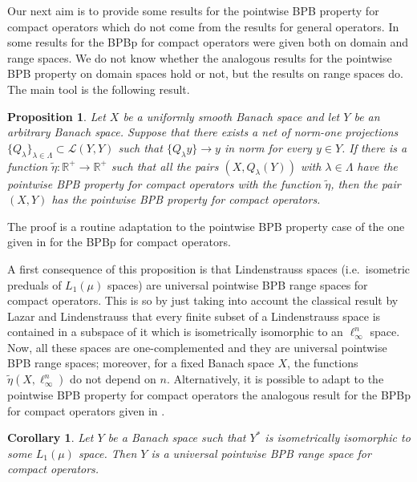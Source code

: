 \documentclass[a4paper,10pt]{amsart}
\theoremstyle{plain}
\newtheorem{corollary}[theorem]{Corollary}
\newtheorem{proposition}[theorem]{Proposition}
\theoremstyle{definition}
\newcommand{\R}{\mathbb{R}}
\begin{document}
Our next aim is to provide some results for the pointwise BPB property for compact operators which do not come from the results for general operators. In \cite{DGMM} some results for the BPBp for compact operators were given both on domain and range spaces. We do not know whether the analogous results for the pointwise BPB property on domain spaces hold or not, but the results on range spaces do. The main tool is the following result.


\begin{proposition}\label{pointwise BPB property:comp:range} Let $X$ be a uniformly smooth Banach space and let $Y$ be an arbitrary Banach space. Suppose that there exists a net of norm-one projections $\{Q_{\lambda}\}_{\lambda\in \Lambda} \subset \mathcal{L}(Y,Y)$ such that $\{Q_{\lambda} y\} \longrightarrow y$ in norm for every $y\in Y$. If there is a function $\tilde\eta:\R^+\longrightarrow \R^+$ such that all the pairs $(X, Q_{\lambda} (Y))$ with $\lambda\in \Lambda$ have the pointwise BPB property for compact operators with the function $\tilde\eta$, then the pair $(X, Y)$ has the pointwise BPB property for compact operators.
\end{proposition}

The proof is a routine adaptation to the pointwise BPB property case of the one given in \cite[Proposition 2.5]{DGMM} for the BPBp for compact operators.

A first consequence of this proposition is that Lindenstrauss spaces (i.e.\ isometric preduals of $L_1(\mu)$ spaces) are universal pointwise BPB range spaces for compact operators. This is so by just taking into account the classical result by Lazar and Lindenstrauss that every finite subset of a Lindenstrauss space is contained in a subspace of it which is isometrically isomorphic to an $\ell_\infty^n$ space. Now, all these spaces are one-complemented and they are universal pointwise BPB range spaces; moreover, for a fixed Banach space $X$, the functions $\tilde\eta(X,\ell_\infty^n)$ do not depend on $n$. Alternatively, it is possible to adapt to the pointwise BPB property for compact operators the analogous result for the BPBp for compact operators given in \cite[Theorem 4.2]{8authors}.

\begin{corollary}
Let $Y$ be a Banach space such that $Y^*$ is isometrically isomorphic to some $L_1(\mu)$ space. Then $Y$ is a universal pointwise BPB range space for compact operators.
\end{corollary}
\end{document}
